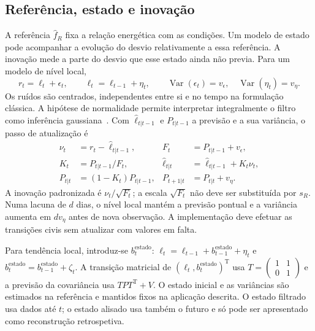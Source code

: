 \subsection{Referência, estado e inovação}
\label{sec:mat-tres-canais}
A referência $\widehat f_R$ fixa a relação energética com as condições. Um modelo de estado pode acompanhar a evolução do desvio relativamente a essa referência. A inovação mede a parte do desvio que esse estado ainda não previa. Para um modelo de nível local,
\begin{equation}
r_t=\ell_t+\epsilon_t,
\qquad \ell_t=\ell_{t-1}+\eta_t,
\qquad \operatorname{Var}(\epsilon_t)=v_\epsilon,\quad\operatorname{Var}(\eta_t)=v_\eta.
\label{eq:mat-nivel-local}
\end{equation}
Os ruídos são centrados, independentes entre si e no tempo na formulação clássica. A hipótese de normalidade permite interpretar integralmente o filtro como inferência gaussiana~\parencite{DurbinKoopman2012}. Com $\widehat\ell_{t|t-1}$ e $P_{t|t-1}$ a previsão e a sua variância, o passo de atualização é
\begin{align}
\nu_t&=r_t-\widehat\ell_{t|t-1}, &F_t&=P_{t|t-1}+v_\epsilon,\label{eq:mat-inovacao}\\
K_t&=P_{t|t-1}/F_t, &\widehat\ell_{t|t}&=\widehat\ell_{t|t-1}+K_t\nu_t,\label{eq:mat-kalman}\\
P_{t|t}&=(1-K_t)P_{t|t-1}, &P_{t+1|t}&=P_{t|t}+v_\eta.\label{eq:mat-kalman-variancia}
\end{align}
A inovação padronizada é $\nu_t/\sqrt{F_t}$; a escala $\sqrt{F_t}$ não deve ser substituída por $s_R$. Numa lacuna de $d$ dias, o nível local mantém a previsão pontual e a variância aumenta em $d v_\eta$ antes de nova observação. A implementação deve efetuar as transições civis sem atualizar com valores em falta.

Para tendência local, introduz-se $b_t^{\mathrm{estado}}$: $\ell_t=\ell_{t-1}+b_{t-1}^{\mathrm{estado}}+\eta_t$ e $b_t^{\mathrm{estado}}=b_{t-1}^{\mathrm{estado}}+\zeta_t$. A transição matricial de $(\ell_t,b_t^{\mathrm{estado}})^{\mathrm T}$ usa $T=\left(\begin{smallmatrix}1&1\\0&1\end{smallmatrix}\right)$ e a previsão da covariância usa $TP T^{\mathrm T}+V$. O estado inicial e as variâncias são estimados na referência e mantidos fixos na aplicação descrita. O estado filtrado usa dados até $t$; o estado alisado usa também o futuro e só pode ser apresentado como reconstrução retrospetiva.


